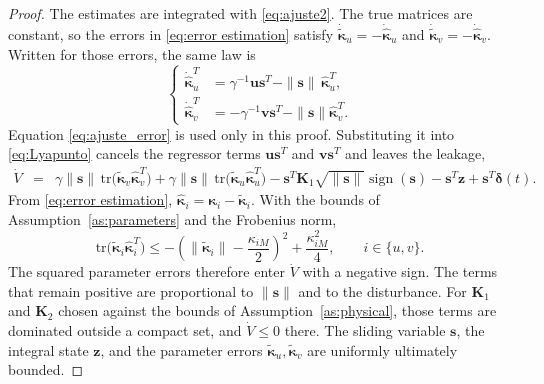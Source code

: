 \documentclass[sn-mathphys-num]{sn-jnl}
\DeclareMathOperator{\sign}{sign}
\theoremstyle{thmstyleone}%
\theoremstyle{thmstyletwo}%
\theoremstyle{thmstylethree}%
\begin{document}
\begin{proof}
The estimates are integrated with \eqref{eq:ajuste2}. The true matrices are constant, so the errors in \eqref{eq:error estimation} satisfy \(\dot{\tilde{\boldsymbol{\kappa}}}_u=-\dot{\hat{\boldsymbol{\kappa}}}_u\) and \(\dot{\tilde{\boldsymbol{\kappa}}}_v=-\dot{\hat{\boldsymbol{\kappa}}}_v\). Written for those errors, the same law is
\begin{equation}\label{eq:ajuste_error}
\left\{
\begin{aligned}
\dot{\hat{\boldsymbol{\kappa}}}_u^T &=\gamma^{-1}\mathbf{u}\mathbf{s}^{T} - \|\mathbf{s}\|\,\hat{\boldsymbol{\kappa}}_u^{T},\\
\dot{\hat{\boldsymbol{\kappa}}}_v^T &=- \gamma^{-1}\mathbf{v}\mathbf{s}^{T} - \|\mathbf{s}\|\hat{\boldsymbol{\kappa}}_v^{T}.
\end{aligned}
\right.
\end{equation}
Equation \eqref{eq:ajuste_error} is used only in this proof. Substituting it into \eqref{eq:Lyapunto} cancels the regressor terms \(\mathbf{u}\mathbf{s}^{T}\) and \(\mathbf{v}\mathbf{s}^{T}\) and leaves the leakage,
\begin{eqnarray}\label{eq:Lyap_trace}
   \dot{V} &=& \gamma\|\mathbf{s}\|\,\mathrm{tr}\big(\boldsymbol{\tilde{\kappa}}_v\hat{\boldsymbol{\kappa}}_v^{T}\big)+\gamma\|\mathbf{s}\|\,\mathrm{tr}\big(\boldsymbol{\tilde{\kappa}}_u\hat{\boldsymbol{\kappa}}_u^{T}\big)-\mathbf{s}^T\mathbf{K}_1\sqrt{\|\mathbf{s}\|}\sign(\mathbf{s})- \mathbf{s}^T\mathbf{z}
     +\mathbf{s}^T\boldsymbol{\delta}(t).
\end{eqnarray}
From \eqref{eq:error estimation}, \(\hat{\boldsymbol{\kappa}}_i=\boldsymbol{\kappa}_i-\boldsymbol{\tilde{\kappa}}_i\). With the bounds of Assumption~\ref{as:parameters} and the Frobenius norm,
\begin{equation}
\mathrm{tr}\big(\boldsymbol{\tilde{\kappa}}_i\hat{\boldsymbol{\kappa}}_i^{T}\big)
\le -\left(\|\boldsymbol{\tilde{\kappa}}_i\|-\frac{\kappa_{iM}}{2}\right)^{2}+\frac{\kappa_{iM}^{2}}{4},
\qquad i\in\{u,v\}.
\end{equation}
The squared parameter errors therefore enter \(\dot{V}\) with a negative sign. The terms that remain positive are proportional to \(\|\mathbf{s}\|\) and to the disturbance. For \(\mathbf{K}_1\) and \(\mathbf{K}_2\) chosen against the bounds of Assumption~\ref{as:physical}, those terms are dominated outside a compact set, and \(\dot{V}\le 0\) there. The sliding variable \(\mathbf{s}\), the integral state \(\mathbf{z}\), and the parameter errors \(\boldsymbol{\tilde{\kappa}}_u,\boldsymbol{\tilde{\kappa}}_v\) are uniformly ultimately bounded.

\end{proof}
\end{document}
